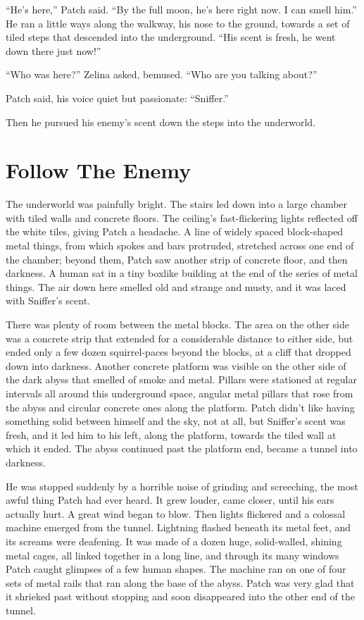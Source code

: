 \documentclass[ebook,oneside,openany,17pt]{memoir}
\newenvironment{tolerant}[1]{%
  \par\tolerance=#1\relax
}{%
  \par
}
\renewcommand{\thechapter}{\Roman{chapter}}
\newcounter{sections}
\newcommand{\sections}[1]{%
  \section*{#1}
  \addtocounter{sections}{1}%
  \pdfbookmark[1]{#1}{section.\thechapter.\thesections}}
\begin{document}
“He’s here,” Patch said. “By the full moon, he’s here right now. I can
smell him.” He ran a little ways along the walkway, his nose to the
ground, towards a set of tiled steps that descended into the
underground. “His scent is fresh, he went down there just now!”

“Who was here?” Zelina asked, bemused. “Who are you talking about?”

Patch said, his voice quiet but passionate: “Sniffer.”

Then he pursued his enemy’s scent down the steps into the underworld.


\sections{Follow The Enemy}

The underworld was painfully bright. The stairs led down into a large
chamber with tiled walls and concrete floors. The ceiling’s
fast-flickering lights reflect\-ed off the white tiles, giving Patch a
headache. A line of widely spaced block-shaped metal things, from
which spokes and bars protruded, stretched across one end of the
chamber; beyond them, Patch saw another strip of concrete floor, and
then darkness. A human sat in a tiny boxlike building at the end of
the series of metal things. The air down here smelled old and strange
and musty, and it was laced with Sniffer’s scent.

\begin{tolerant}{1000}
There was plenty of room between the metal blocks. The area on the
other side was a concrete strip that extended for a considerable
distance to either side, but ended only a few dozen squirrel-paces
beyond the blocks, at a cliff that dropped down into darkness. Another
concrete platform was visible on the other side of the dark abyss that
smelled of smoke and metal. Pillars were stationed at regular
intervals all around this underground space, angular metal pillars
that rose from the abyss and circular concrete ones along the
platform. Patch didn’t like having something solid between himself and
the sky, not at all, but Sniffer’s scent was fresh, and it led him to
his left, along the platform, towards the tiled wall at which it
ended. The abyss continued past the platform end, became a tunnel into
darkness.
\end{tolerant}

\begin{tolerant}{1000}
He was stopped suddenly by a horrible noise of grinding and
screeching, the most awful thing Patch had ever heard. It grew louder,
came closer, until his ears actually hurt. A great wind began to
blow. Then lights flickered and a colossal machine emerged from the
tunnel. Lightning flashed beneath its metal feet, and its screams were
deafening. It was made of a dozen huge, solid-walled, shining metal
cages, all linked together in a long line, and through its many
windows Patch caught glimpses of a few human shapes. The machine ran
on one of four sets of metal rails that ran along the base of the
abyss. Patch was very glad that it shrieked past without stopping and
soon disappeared into the other end of the tunnel.
\end{tolerant}
\end{document}
